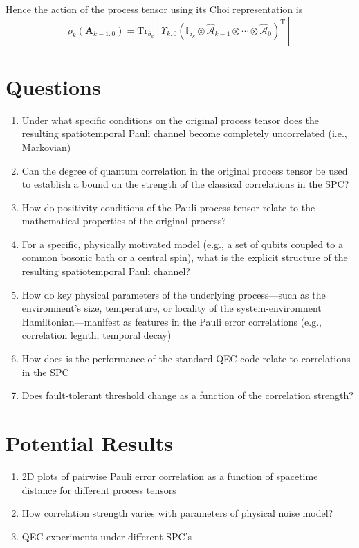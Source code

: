 \documentclass{article}
\begin{document}
Hence the action of the process tensor using its Choi representation is
$$\rho_k(\mathbf{A}_{k-1:0}) \!=\! \text{Tr}_{\overline{\mathfrak{o}}_k} \! \left[\Upsilon_{k:0}\left(\mathbb{I}_{\mathfrak{o}_k}\otimes \hat{\mathcal{A}}_{k-1}\otimes \cdots \otimes\hat{\mathcal{A}}_0\right)^\text{T}\right]$$

\section{Questions}
\begin{enumerate}
    \item Under what specific conditions on the original process tensor does the resulting spatiotemporal Pauli channel become completely uncorrelated (i.e., Markovian)
    \item Can the degree of quantum correlation in the original process tensor be used to establish a bound on the strength of the classical correlations in the SPC?
    \item How do positivity conditions of the Pauli process tensor relate to the mathematical properties of the original process?
    \item For a specific, physically motivated model (e.g., a set of qubits coupled to a common bosonic bath or a central spin), what is the explicit structure of the resulting spatiotemporal Pauli channel?
    \item How do key physical parameters of the underlying process---such as the environment's size, temperature, or locality of the system-environment Hamiltonian---manifest as features in the Pauli error correlations (e.g., correlation legnth, temporal decay)
    \item How does is the performance of the standard QEC code relate to correlations in the SPC
    \item Does fault-tolerant threshold change as a function of the correlation strength?
\end{enumerate}

\section{Potential Results}
\begin{enumerate}
    \item 2D plots of pairwise Pauli error correlation as a function of spacetime distance for different process tensors
    \item How correlation strength varies with parameters of physical noise model?
    \item QEC experiments under different SPC's
    
\end{enumerate}
\end{document}
